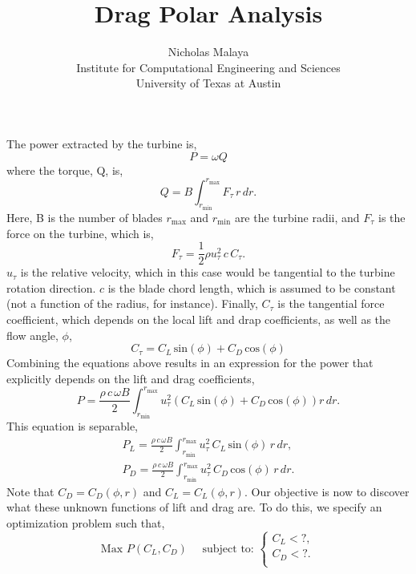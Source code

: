 \documentclass{article}
\title{\bf{Drag Polar Analysis}}
\author{Nicholas Malaya \\ Institute for Computational Engineering and Sciences \\ University of Texas at Austin} \date{}
\begin{document}
\maketitle

\newpage

The power extracted by the turbine is, 
\begin{equation}
 P = \omega Q
\end{equation}
where the torque, Q, is, 
\begin{equation}
 Q = B \int_{r_{\text{min}}}^{r_{\text{max}}} F_{\tau}\, r\, dr.
\end{equation}
Here, B is the number of blades $r_{\text{max}}$ and $r_{\text{min}}$
are the turbine radii, and $F_{\tau}$ is the force on the turbine, which
is, 
\begin{equation}
 F_{\tau} = \frac{1}{2}\rho u_{\tau}^2 \, c \, C_{\tau}.
\end{equation}
$u_\tau$ is the relative velocity, which in this case would be
tangential to the turbine rotation direction. $c$ is the blade chord
length, which is assumed to be constant (not a function of the radius,
for instance). Finally, $C_{\tau}$ is the tangential force coefficient,
which depends on the local lift and drap coefficients, as well as the
flow angle, $\phi$, 
\begin{equation}
 C_{\tau} = C_L \,\text{sin}(\phi) + C_D \,\text{cos}(\phi)
\end{equation}
Combining the equations above results in an expression for the power
that explicitly depends on the lift and drag coefficients, 
\begin{equation*}
 P = \frac{\rho\, c\, \omega B}{2}
  \int_{r_{\text{min}}}^{r_{\text{max}}} u_{\tau}^2 \left(C_L
						     \,\text{sin}(\phi)
						     + C_D
						     \,\text{cos}(\phi)
						    \right) r\,dr. 
\end{equation*}
This equation is separable, 
\begin{align*}
 P_L = \frac{\rho\, c\, \omega B}{2}
  \int_{r_{\text{min}}}^{r_{\text{max}}} u_{\tau}^2 \, C_L \,\text{sin}(\phi)\, r\,dr, \\
 P_D = \frac{\rho\, c\, \omega B}{2}
  \int_{r_{\text{min}}}^{r_{\text{max}}} u_{\tau}^2 \, C_D \,\text{cos}(\phi)\, r\,dr. 
\end{align*}
Note that $C_D = C_D(\phi,r)$ and $C_L = C_L(\phi,r)$. Our objective is
now to discover what these unknown functions of lift and drag are. To do
this, we specify an optimization problem such that, 
\begin{equation*} 
 \text{Max } P(C_L,C_D) \quad \text{ subject to: }
  \begin{cases}
    C_L < ?, \\
    C_D < ?. \\
  \end{cases}
\end{equation*}
\end{document}

